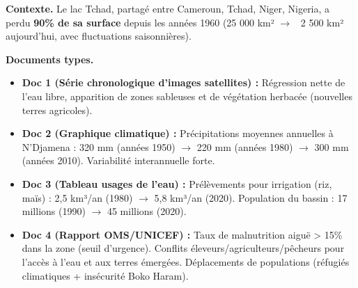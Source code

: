 \documentclass[11pt]{article}
\begin{document}
\begin{experience}
\textbf{Contexte.} Le lac Tchad, partagé entre Cameroun, Tchad, Niger, Nigeria, a perdu \textbf{90\% de sa surface} depuis les années 1960 (25 000 km² $\rightarrow$ ~2 500 km² aujourd'hui, avec fluctuations saisonnières).

\textbf{Documents types.}
\begin{itemize}
    \item \textbf{Doc 1 (Série chronologique d'images satellites) :} Régression nette de l'eau libre, apparition de zones sableuses et de végétation herbacée (nouvelles terres agricoles).
    \item \textbf{Doc 2 (Graphique climatique) :} Précipitations moyennes annuelles à N'Djamena : 320 mm (années 1950) $\rightarrow$ 220 mm (années 1980) $\rightarrow$ 300 mm (années 2010). Variabilité interannuelle forte.
    \item \textbf{Doc 3 (Tableau usages de l'eau) :} Prélèvements pour irrigation (riz, maïs) : 2,5 km³/an (1980) $\rightarrow$ 5,8 km³/an (2020). Population du bassin : 17 millions (1990) $\rightarrow$ 45 millions (2020).
    \item \textbf{Doc 4 (Rapport OMS/UNICEF) :} Taux de malnutrition aiguë > 15\% dans la zone (seuil d'urgence). Conflits éleveurs/agriculteurs/pêcheurs pour l'accès à l'eau et aux terres émergées. Déplacements de populations (réfugiés climatiques + insécurité Boko Haram).
\end{itemize}


\end{experience}
\end{document}
